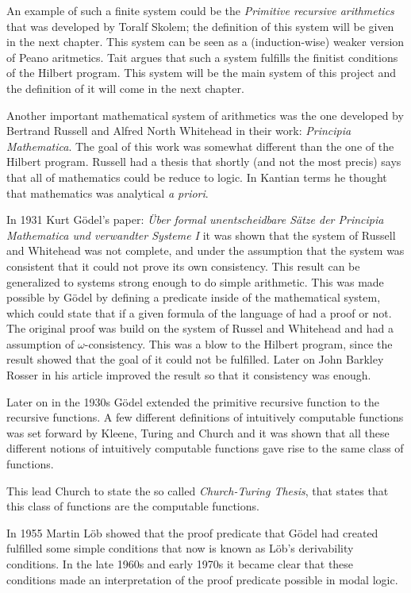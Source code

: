 \documentclass[../main.tex]{subfiles}
\begin{document}
An example of such a finite system could be the \textit{Primitive recursive
arithmetics} that was developed by Toralf Skolem; the definition of this system
will be given in the next chapter. This system can be seen as a
(induction-wise) weaker version of Peano aritmetics. Tait  argues
that such a system fulfills the finitist conditions of the Hilbert program.
This system will be the main system of this project and the definition of it
will come in the next chapter.

Another  important mathematical system of arithmetics was
the one developed by Bertrand Russell and Alfred North Whitehead in their work:
\textit{Principia Mathematica}. The goal of this work was somewhat different
than the one of the Hilbert program. Russell had a thesis that shortly (and not
the most precis) says that all of mathematics could be reduce to logic. In
Kantian terms he thought that mathematics was analytical \textit{a priori}. 

In 1931 Kurt Gödel's paper: \textit{Über formal unentscheidbare Sätze der
Principia Mathematica und verwandter Systeme I} it was shown  that the system of
Russell and Whitehead was not complete, and under the assumption that the
system was consistent that it could not prove its own consistency.
This result can be generalized to systems strong enough to do simple
arithmetic. This was made possible by Gödel by defining a predicate inside of
the mathematical system, which could state that if a given formula of the
language of had a proof or not.
The
original proof was build on the system of Russel and Whitehead and had a
assumption of $\omega$-consistency. This
was a blow to the Hilbert program, since the result showed that the goal of it
could not be fulfilled. Later on John Barkley Rosser in his article
\parencite{Ross1936} improved the
result so that it  consistency was enough.



Later on in the 1930s Gödel extended the primitive recursive function to the  recursive
functions. A few different definitions of intuitively computable functions was
set forward by Kleene, Turing and Church and it was shown that all these
different notions of intuitively computable functions gave rise to the same
class of functions.

This lead Church to state the so called \textit{Church-Turing Thesis}, that
states that this class of functions are the computable functions.

In 1955 Martin Löb showed that the proof predicate that Gödel had created
fulfilled some simple conditions that now is known as Löb's derivability
conditions. In the late 1960s and early 1970s it became clear that these
conditions made an interpretation of the proof predicate possible in modal
logic.
\end{document}
